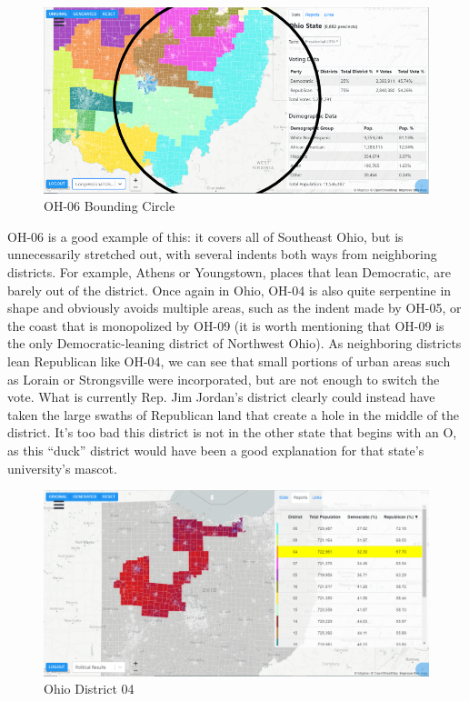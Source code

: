 \documentclass[letterpaper]{article}
\begin{document}
\begin{figure}[H]
	\includegraphics[width=\linewidth]{./figures/OH-06-BoundingCircle.png}
	\caption{OH-06 Bounding Circle}
	\label{fig:oh06boundingCircle}
\end{figure}

OH-06 is a good example of this: it covers all of Southeast Ohio, but is unnecessarily stretched out, with several indents both ways from neighboring districts. For example, Athens or Youngstown, places that lean Democratic, are barely out of the district. Once again in Ohio, OH-04 is also quite serpentine in shape and obviously avoids multiple areas, such as the indent made by OH-05, or the coast that is monopolized by OH-09 (it is worth mentioning that OH-09 is the only Democratic-leaning district of Northwest Ohio). As neighboring districts lean Republican like OH-04, we can see that small portions of urban areas such as Lorain or Strongsville were incorporated, but are not enough to switch the vote. What is currently Rep. Jim Jordan’s district clearly could instead have taken the large swaths of Republican land that create a hole in the middle of the district. It’s too bad this district is not in the other state that begins with an O, as this “duck” district would have been a good explanation for that state’s university’s mascot.

\begin{figure}[H]
	\includegraphics[width=\linewidth]{./figures/OH-04.png}
	\caption{Ohio District 04}
	\label{fig:oh04border}
\end{figure}
\end{document}

